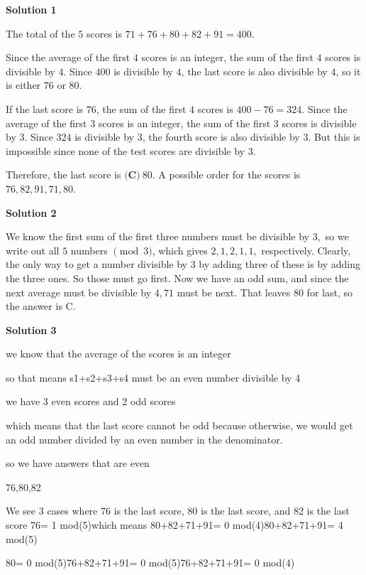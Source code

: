 \begin{enumerate}
\textbf{Solution 1}

The total of the $5$ scores is $71+76+80+82+91=400$.

 Since the average of the first $4$ scores is an integer, the sum of the first $4$ scores is divisible by $4$.  Since $400$ is divisible by $4$, the last score is also divisible by $4$, so it is either $76$ or $80$.

 If the last score is $76$, the sum of the first $4$ scores is $400-76=324$.  Since the average of the first $3$ scores is an integer, the sum of the first $3$ scores is divisible by $3$.  Since $324$ is divisible by $3$, the fourth score is also divisible by $3$.  But this is impossible since none of the test scores are divisible by $3$.

 Therefore, the last score is $\boxed{\textbf{(C)}\ 80}$.  A possible order for the scores is $76,82,91,71,80$.

 



\textbf{Solution 2}

We know the first sum of the first three numbers must be divisible by $3,$ so we write out all $5$ numbers $\pmod{3}$, which gives $2,1,2,1,1,$ respectively. Clearly, the only way to get a number divisible by $3$ by adding three of these is by adding the three ones. So those must go first. Now we have an odd sum, and since the next average must be divisible by $4, 71$ must be next. That leaves $80$ for last, so the answer is $\mathrm{C}$.

 



\textbf{Solution 3}

we know that the average of the scores is an integer 

 so that means s1+s2+s3+s4 must be an even number divisible by 4 

 we have 3 even scores and 2 odd scores

 which means that the last score cannot be odd because otherwise, we would get an odd number divided by an even number in the denominator.

 so we have answers that are even 

 76,80,82

 We see 3 cases where 76 is the last score, 80 is the last score, and 82 is the last score  76= 1 mod(5)which means 80+82+71+91= 0 mod(4)80+82+71+91= 4 mod(5)

 80= 0 mod(5)76+82+71+91= 0 mod(5)76+82+71+91= 0 mod(4)


\end{enumerate}
